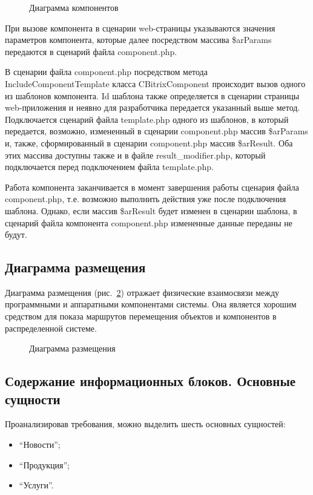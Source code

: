 \begin{figure}[h]
\caption{Диаграмма компонентов}
\label{data:image}
\end{figure}

При вызове компонента в сценарии web-страницы указываются значения параметров компонента, которые далее посредством массива \$arParams передаются в сценарий файла component.php.

В сценарии файла component.php посредством метода IncludeComponentTemplate класса CBitrixComponent происходит вызов одного из шаблонов компонента. Id шаблона также определяется в сценарии страницы web-приложения и неявно для разработчика передается указанный выше метод. Подключается сценарий файла template.php одного из шаблонов, в который передается, возможно, измененный в сценарии component.php массив \$arParams и, также, сформированный в сценарии component.php массив \$arResult. Оба этих массива доступны также и в файле result\_modifier.php, который подключается перед подключением файла template.php. 

Работа компонента заканчивается в момент завершения работы сценария файла component.php, т.е. возможно выполнить действия уже после подключения шаблона. Однако, если массив \$arResult будет изменен в сценарии шаблона, в сценарий файла компонента component.php измененные данные переданы не будут.

\subsection{Диаграмма размещения}

Диаграмма размещения (рис.~\ref{place:image}) отражает физические взаимосвязи между программными и аппаратными компонентами системы. Она является хорошим средством для показа маршрутов перемещения объектов и компонентов в распределенной системе.
\begin{figure}[ht]
\caption{Диаграмма размещения}
\label{place:image}
\end{figure}

\subsection{Содержание информационных блоков. Основные сущности}

Проанализировав требования, можно выделить шесть основных сущностей:
\begin{itemize}
\item ``Новости'';
\item ``Продукция'';
\item ``Услуги''.
\end{itemize}

